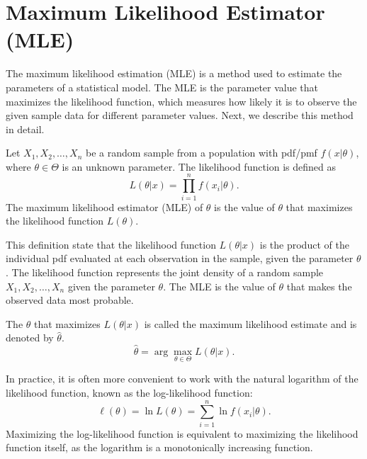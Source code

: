 \section{Maximum Likelihood Estimator (MLE)}

The maximum likelihood estimation (MLE) is a method used to estimate the parameters of a statistical model. The MLE is the parameter value that maximizes the likelihood function, which measures how likely it is to observe the given sample data for different parameter values.
Next, we describe this method in detail.

\begin{definition}
    Let $X_1, X_2, \ldots, X_n$ be a random sample from a population with pdf/pmf $f(x|\theta)$, where $\theta \in \Theta$ is an unknown parameter. The likelihood function is defined as
    \[
        L(\theta|x) = \prod_{i=1}^{n} f(x_i | \theta).
    \]
    The maximum likelihood estimator (MLE) of $\theta$ is the value of $\theta$ that maximizes the likelihood function $L(\theta)$.
\end{definition}

This definition state that the likelihood function $L(\theta | x)$ is the product of the individual pdf evaluated at each observation in the sample, given the parameter $\theta$. 
The likelihood function represents the joint density of a random sample $X_1, X_2, \ldots, X_n$ given the parameter $\theta$.
The MLE is the value of $\theta$ that makes the observed data most probable.

The $\theta$ that maximizes $L(\theta|x)$ is called the maximum likelihood estimate and is denoted by $\hat{\theta}$.
\[
    \hat{\theta} = \arg\max_{\theta \in \Theta} L(\theta | x).
\]

In practice, it is often more convenient to work with the natural logarithm of the likelihood function, known as the log-likelihood function:
\[
    \ell(\theta) = \ln L(\theta) = \sum_{i=1}^{n} \ln f(x_i | \theta).
\]
Maximizing the log-likelihood function is equivalent to maximizing the likelihood function itself, as the logarithm is a monotonically increasing function.

